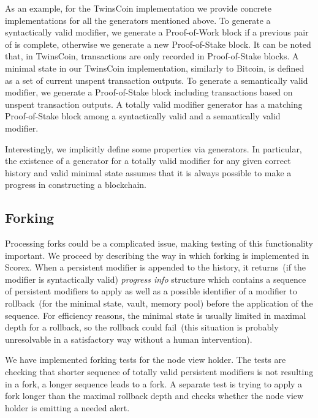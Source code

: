 As an example, for the TwinsCoin implementation we provide concrete implementations for all the generators mentioned above. To generate a syntactically valid modifier, we generate a Proof-of-Work block if a previous pair of {\em<Proof-of-Work block, Proof-of-Stake block>} is complete, otherwise we generate a new Proof-of-Stake block. It can be noted that, in TwinsCoin, transactions are only recorded in Proof-of-Stake blocks. A minimal state in our TwinsCoin implementation, similarly to Bitcoin, is defined as a set of current unspent transaction outputs. To generate a semantically valid modifier, we generate a Proof-of-Stake block including transactions based on unspent transaction outputs. A totally valid modifier generator has a matching Proof-of-Stake block among a syntactically valid and a semantically valid modifier. 

Interestingly, we implicitly define some properties via generators. In particular, the existence of a generator for a totally valid modifier for any given correct history and valid minimal state assumes that it is always possible to make a progress in constructing a blockchain.

\subsection{Forking}
\label{sec:forking}

Processing forks could be a complicated issue, making testing of this functionality important. We proceed by describing the way in which forking is implemented in Scorex. When a persistent modifier is appended to the history, it returns~(if the modifier is syntactically valid) {\em progress info} structure which contains a sequence of persistent modifiers to apply as well as a possible identifier of a modifier to rollback~(for the minimal state, vault, memory pool) before the application of the sequence. For efficiency reasons, the minimal state is usually limited in maximal depth for a rollback, so the rollback could fail~(this situation is probably unresolvable in a satisfactory way without a human intervention). 

We have implemented forking tests for the node view holder. The tests are checking that shorter sequence of totally valid persistent modifiers is not resulting in a fork, a longer sequence leads to a fork. A separate test is trying to apply a fork longer than the maximal rollback depth and checks whether the node view holder is emitting a needed alert.


